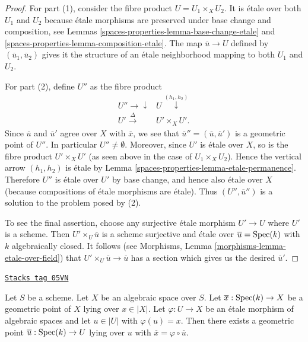 \begin{proof}
For part (1), consider the fibre product $U = U_1 \times_X U_2$.
It is \'etale over both $U_1$ and $U_2$ because \'etale morphisms are
preserved under base change and composition, see
Lemmas \ref{spaces-properties-lemma-base-change-etale} and \ref{spaces-properties-lemma-composition-etale}.
The map $\overline{u} \to U$ defined by $(\overline{u}_1, \overline{u}_2)$
gives it the structure of an \'etale neighborhood mapping to both
$U_1$ and $U_2$.

\medskip\noindent
For part (2), define $U''$ as the fibre product
$$
\begin{array}{cc}U'' \longrightarrow\downarrow & U \overset{(h_1, h_2)}{\downarrow} \\ U' \overset{\Delta}{\longrightarrow} & U' \times_X U'.\end{array}
$$
Since $\overline{u}$ and $\overline{u}'$ agree over $X$ with $\overline{x}$,
we see that $\overline{u}'' = (\overline{u}, \overline{u}')$ is a geometric
point of $U''$. In particular $U'' \not = \emptyset$.
Moreover, since $U'$ is \'etale over $X$, so is the fibre product
$U'\times_X U'$ (as seen above in the case of $U_1 \times_X U_2$).
Hence the vertical arrow $(h_1, h_2)$ is \'etale by
Lemma \ref{spaces-properties-lemma-etale-permanence}.
Therefore $U''$ is \'etale over $U'$ by base change, and hence also
\'etale over $X$ (because compositions of \'etale morphisms are \'etale).
Thus $(U'', \overline{u}'')$ is a solution to the problem posed by (2).

\medskip\noindent
To see the final assertion, choose any surjective \'etale morphism
$U' \to U$ where $U'$ is a scheme. Then
$U' \times_U \overline{u}$ is a scheme surjective and \'etale over
$\overline{u} = \operatorname{Spec}(k)$ with $k$ algebraically closed.
It follows (see
Morphisms, Lemma \ref{morphisms-lemma-etale-over-field})
that $U' \times_U \overline{u} \to \overline{u}$ has a section
which gives us the desired $\overline{u}'$.
\end{proof}

\begin{lemma}
\label{spaces-properties-lemma-geometric-lift-to-usual}
\href{https://stacks.math.columbia.edu/tag/05VN}{\texttt{Stacks tag 05VN}}

Let $S$ be a scheme. Let $X$ be an algebraic space over $S$.
Let $\overline{x} : \operatorname{Spec}(k) \to X$ be a geometric point of $X$
lying over $x \in |X|$. Let $\varphi : U \to X$ be an \'etale morphism
of algebraic spaces and let $u \in |U|$ with $\varphi(u) = x$.
Then there exists a geometric point
$\overline{u} : \operatorname{Spec}(k) \to U$ lying over $u$ with
$\overline{x} = \varphi \circ \overline{u}$.
\end{lemma}

